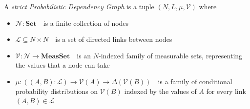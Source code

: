 \documentclass{article}
\newcommand{\modelname}{Probabilistic Dependency Graph}
\newcommand\Set{\textbf{Set}}
\newcommand\MeasSet{\textbf{MeasSet}}
\begin{document}
	\begin{defn}\label{def:model}
		A \emph{strict \modelname} is a tuple $(N, L, \mu, \mathcal V)$ where
		\begin{itemize}[nosep]
			\item $\mathcal N : \Set$~~is a finite collection of nodes
			\item $\mathcal L \subseteq N \times N$~~is a set of directed links between nodes
			\item $\mathcal V : \mathcal N \to \MeasSet $~~is an $N$-indexed family of measurable sets, representing the values that a node can take
			\item $\mu: ((A,B): \mathcal L) \to \mathcal V(A) \to \Delta(\mathcal{V}(B))$~~is a family of conditional probability distributions on $\mathcal V(B)$ indexed by the values of $A$ for every link $(A,B) \in \mathcal L$ %

		\end{itemize}
	\end{defn}
\end{document}
